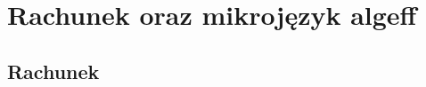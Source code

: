 \documentclass{beamer}
\begin{document}



\section{Rachunek oraz mikrojęzyk algeff}
\subsection{Rachunek}
\end{document}
